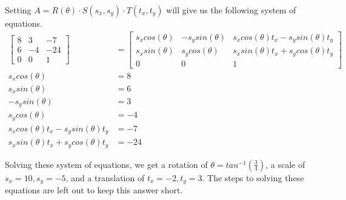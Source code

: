 \documentclass{article} %
\begin{document}
Setting $A = R(\theta) \cdot S(s_x, s_y) \cdot T(t_x, t_y)$ will give us the following system of equations.
\begin{align*}
\left[
\begin{matrix}
8 & 3 & -7\\
6 & -4 & -24\\
0 & 0 & 1
\end{matrix}
\right]
&=
\left[
\begin{matrix}
s_x cos(\theta) & - s_y sin(\theta) & s_x cos(\theta) t_x - s_y sin(\theta) t_y\\
s_x sin(\theta) & s_y cos(\theta) & s_x sin(\theta) t_x + s_y cos(\theta) t_y\\
0 & 0 & 1
\end{matrix}
\right]\\
s_x cos(\theta) &= 8\\
s_x sin(\theta) &= 6\\
- s_y sin(\theta) &= 3\\
s_y cos(\theta) &= -4\\
s_x cos(\theta) t_x - s_y sin(\theta) t_y &= -7\\
s_x sin(\theta) t_x + s_y cos(\theta) t_y &= -24
\end{align*}

Solving these system of equations, we get a rotation of $\theta = tan^{-1}(\frac{3}{4})$, a scale of $s_x=10, s_y=-5$, and a translation of $t_x=-2, t_y=3$. The steps to solving these equations are left out to keep this answer short.
\end{document}
